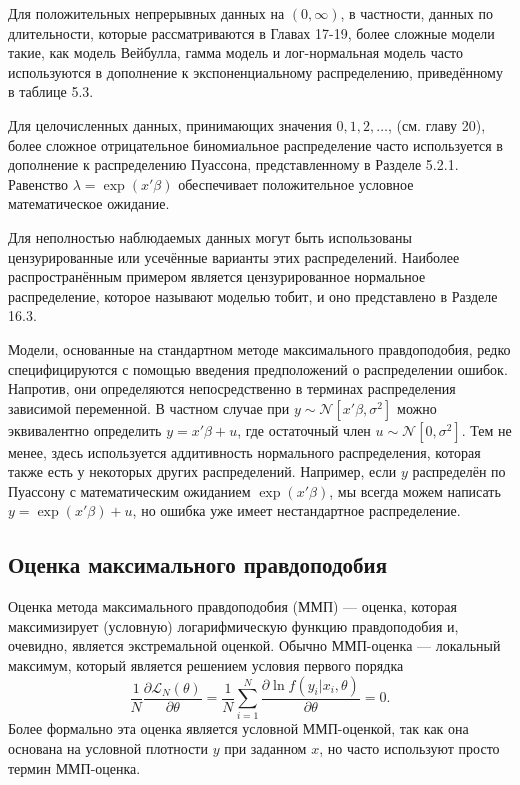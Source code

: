 Для положительных непрерывных данных на $(0,\infty)$, в частности, данных по длительности, которые рассматриваются в Главах 17-19, более сложные модели такие, как модель Вейбулла, гамма модель и лог-нормальная модель часто используются в дополнение к экспоненциальному распределению, приведённому в таблице 5.3.

Для целочисленных данных, принимающих значения $0,1,2, \dots$, (см. главу 20), более сложное отрицательное биномиальное распределение часто используется в дополнение к распределению Пуассона, представленному в Разделе 5.2.1. Равенство $\lambda=\exp(x'\beta)$ обеспечивает положительное условное математическое ожидание.

Для неполностью наблюдаемых данных могут быть использованы цензурированные или усечённые варианты этих распределений. Наиболее распространённым примером является цензурированное нормальное распределение, которое называют моделью тобит, и оно представлено в Разделе 16.3.

Модели, основанные на стандартном методе максимального правдоподобия, редко специфицируются с помощью введения предположений о распределении ошибок. Напротив, они определяются непосредственно в терминах распределения зависимой переменной. В частном случае при $y \sim \mathcal{N}[x'\beta,\sigma^2]$ можно эквивалентно определить $y=x'\beta+u$, где остаточный член $u \sim \mathcal{N}[0,\sigma^2]$. Тем не менее, здесь используется аддитивность нормального распределения, которая также есть у некоторых других распределений. Например, если $y$ распределён по Пуассону с математическим ожиданием $\exp(x'\beta)$, мы всегда можем написать $y=\exp(x'\beta)+u$, но ошибка уже имеет нестандартное распределение.

\subsection{Оценка максимального правдоподобия}

Оценка метода максимального правдоподобия (ММП) --- оценка, которая максимизирует (условную) логарифмическую функцию правдоподобия и, очевидно, является экстремальной оценкой. Обычно ММП-оценка --- локальный максимум, который является решением условия первого порядка
\begin{equation}
\frac{1}{N} \frac{\partial \mathcal{L}_{N}(\theta)}{\partial \theta} = \frac{1}{N} \sum_{i=1}^{N} \frac{\partial \ln f(y_i|x_i,\theta)}{\partial \theta}=0.
\end{equation}
Более формально эта оценка является условной ММП-оценкой, так как она основана на условной плотности $y$ при заданном $x$, но часто используют просто термин ММП-оценка.

